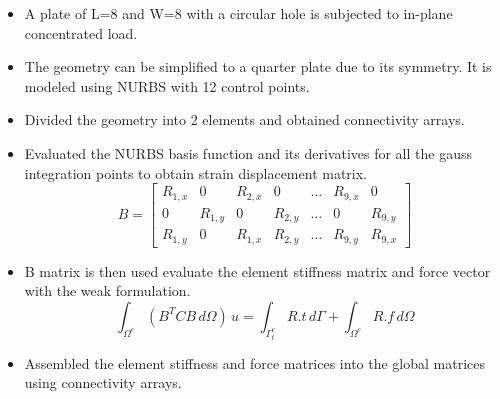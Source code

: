 \documentclass{beamer}
\begin{document}
\begin{itemize}
    \item A plate of L=8 and W=8 with a circular hole is subjected to in-plane concentrated load.

    \item The geometry can be simplified to a quarter plate due to its symmetry. It is modeled using NURBS with 12 control points.
\newpage
  
    \item Divided the geometry into 2 elements and obtained connectivity arrays.
    \item Evaluated the NURBS basis function and its derivatives for all the gauss integration points to obtain strain displacement matrix.
    \begin{equation*}
        B=\begin{bmatrix}
        R_{1,x} & 0 & R_{2,x} & 0 & \dots & R_{9,x} & 0\\
        0 & R_{1,y} & 0 &R_{2,y} & \dots & 0 & R_{9,y}\\
        R_{1,y} & 0 &R_{1,x} &  R_{2,y} & \dots &  R_{9,y} &R_{9,x}
        \end{bmatrix}
    \end{equation*}
    \item B matrix is then used evaluate the element stiffness matrix and force vector with the weak formulation.
    \begin{equation*}
        \int_{\Omega^e} (B^TCB  \,d\Omega)\,u = \int_{\Gamma^e_t} R.t \,d\Gamma +\int_{\Omega^e} R.f \,d\Omega
    \end{equation*}
    \item Assembled the element stiffness and force matrices into the global matrices using connectivity arrays.

      \newpage
  

\end{itemize}
\end{document}
